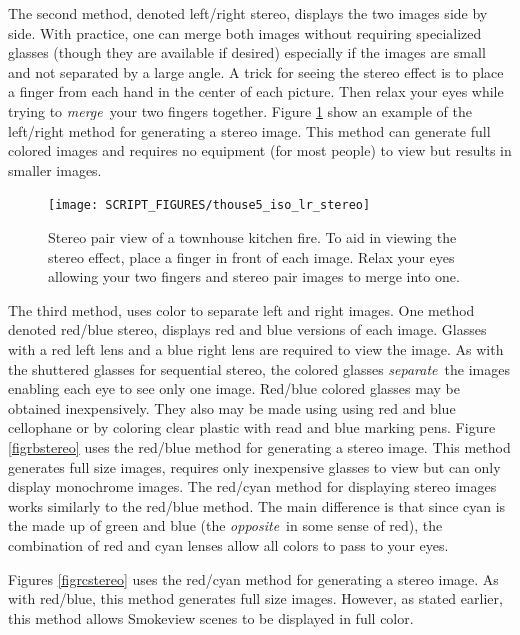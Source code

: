 \documentclass[11pt,twoside]{book}
\begin{document}
The second method, denoted left/right stereo, displays the two
images side by side.  With practice, one can merge both images
without requiring specialized glasses (though they are available
if desired) especially if the images are small and not separated
by a large angle. A trick for seeing the stereo effect is to place
a finger from each hand in the center of each picture.  Then relax
your eyes while trying to {\em merge}\ your two fingers together.
Figure \ref{figlrstereo} show an example of the left/right method
for generating a stereo image.  This method can generate full
colored images and requires no equipment (for most people) to view
but results in smaller images.
\begin{figure}[\figoptions]
\begin{center}
\texttt{[image: SCRIPT\_FIGURES/thouse5\_iso\_lr\_stereo]}
\caption[Stereo pair view of a townhouse kitchen fire.]{ Stereo
pair view of a townhouse kitchen fire. To aid in viewing the
stereo effect, place a finger in front of each image.  Relax your
eyes allowing your two fingers and stereo pair images to merge
into one. } \label{figlrstereo}
\end{center}
\end{figure}

The third method, uses color to separate left and right images.
One method denoted red/blue stereo, displays red and blue versions
of each image.  Glasses with a red left lens and a blue right lens
are required to view the image.  As with the shuttered glasses for
sequential stereo, the colored glasses {\em separate}\ the images
enabling each eye to see only one image.  Red/blue colored glasses
may be obtained inexpensively. They also may be made using using
red and blue cellophane or by coloring clear plastic with read and
blue marking pens.  Figure \ref{figrbstereo} uses the red/blue
method for generating a stereo image.  This method generates full
size images, requires only inexpensive glasses to view but can
only display monochrome images. The red/cyan method for displaying
stereo images works similarly to the red/blue method.  The main
difference is that since cyan is the made up of green and blue
(the {\em opposite}\ in some sense of red), the combination of red
and cyan lenses allow all colors to pass to your eyes.

Figures \ref{figrcstereo} uses the red/cyan method for generating
a stereo image.  As with red/blue, this method generates full size
images.  However, as stated earlier, this method allows Smokeview
scenes to be displayed in full color.
\end{document}
